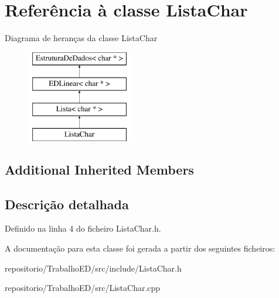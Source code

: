 \hypertarget{classListaChar}{\section{Referência à classe Lista\-Char}
\label{classListaChar}
}
Diagrama de heranças da classe Lista\-Char\begin{figure}[H]
\begin{center}
\leavevmode
\includegraphics[height=4.000000cm]{classListaChar}
\end{center}
\end{figure}
\subsection*{Additional Inherited Members}


\subsection{Descrição detalhada}


Definido na linha 4 do ficheiro Lista\-Char.\-h.



A documentação para esta classe foi gerada a partir dos seguintes ficheiros\-:\begin{DoxyCompactItemize}
\item 
repositorio/\-Trabalho\-E\-D/src/include/Lista\-Char.\-h\item 
repositorio/\-Trabalho\-E\-D/src/Lista\-Char.\-cpp\end{DoxyCompactItemize}
